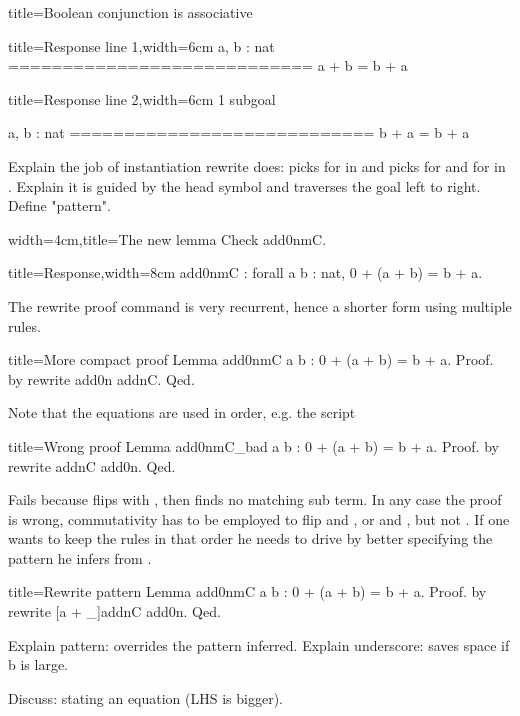 \begin{coq}{title=Boolean conjunction is associative}
\begin{coqout}{title=Response line 1,width=6cm}
  a, b : nat
  ============================
   a + b = b + a
\end{coqout}
\begin{coqout}{title=Response line 2,width=6cm}
1 subgoal

  a, b : nat
  ============================
   b + a = b + a
\end{coqout}

Explain the job of instantiation rewrite does: picks  for
 in  and picks  for  and  for  in
.  Explain it is guided by the head symbol \C{+} and traverses
the goal left to right.  Define "pattern".

\begin{coq}{width=4cm,title=The new lemma}
Check add0nmC.
\end{coq}
\begin{coqout}{title=Response,width=8cm}
add0nmC : forall a b : nat, 0 + (a + b) = b + a.
\end{coqout}

The rewrite proof command is very recurrent, hence a shorter form
using multiple rules.

\begin{coq}{title=More compact proof}
Lemma add0nmC a b : 0 + (a + b) = b + a.
Proof. by rewrite add0n addnC. Qed.
\end{coq}

Note that the equations are used in order, e.g. the script

\begin{coq}{title=Wrong proof}
Lemma add0nmC_bad a b : 0 + (a + b) = b + a.
Proof. by rewrite addnC add0n. Qed.
\end{coq}

Fails because  flips  with , then
 finds no matching sub term.  In any case the proof
is wrong, commutativity has to be employed to flip  and ,
or  and , but not .  If one wants to keep the rules
in that order he needs to drive \Coq{} by better specifying the
pattern he infers from .

\begin{coq}{title=Rewrite pattern}
Lemma add0nmC a b : 0 + (a + b) = b + a.
Proof. by rewrite [a + _]addnC add0n. Qed.
\end{coq}

Explain pattern: overrides the pattern inferred.
Explain underscore: saves space if b is large.

Discuss: stating an equation (LHS is bigger).


\end{coq}
